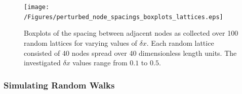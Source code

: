 \documentclass[11pt,titlepage,a4paper]{article}
\begin{document}
			\begin{figure}[tbh]
				\centering
					\texttt{[image: /Figures/perturbed\_node\_spacings\_boxplots\_lattices.eps]}
				\caption{Boxplots of the spacing between adjacent nodes as collected over 100 random lattices for varying values of $\delta x$. Each random lattice consisted of 40 nodes spread over 40 dimensionless length units. The investigated $\delta x$ values range from $0.1$ to $0.5$.}
				\label{fig:perturbed_node_spacings_boxplots_lattices}
			\end{figure}


		\subsubsection{Simulating Random Walks}
		\label{sub:simulatingrandomwalks_perturbed}
			
\end{document}
